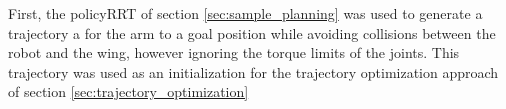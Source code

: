 \documentclass[../thesis.tex]{subfiles}
\begin{document}
First, the policyRRT of section \ref{sec:sample_planning} was used to generate a trajectory a for the arm to a goal position while avoiding collisions between the robot and the wing, however ignoring the torque limits of the joints.
This trajectory was used as an initialization for the trajectory optimization approach of section \ref{sec:trajectory_optimization}



\end{document}
